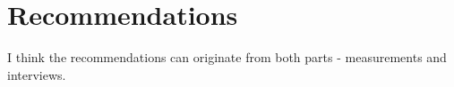 \chapter{Recommendations}
\label{ch_recommendations}

I think the recommendations can originate from both parts - measurements and interviews.